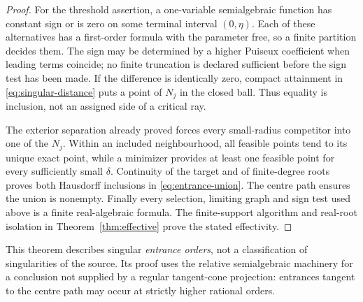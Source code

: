 \begin{proof}
For the threshold assertion, a one-variable semialgebraic function has
constant sign or is zero on some terminal interval $(0,\eta)$. Each
of these alternatives has a first-order formula with the parameter
free, so a finite partition decides them. The sign may be determined
by a higher Puiseux coefficient when leading terms coincide; no finite
truncation is declared sufficient before the sign test has been made.
If the difference is identically zero, compact attainment in
\eqref{eq:singular-distance} puts a point of $N_j$ in the closed ball.
Thus equality is inclusion, not an assigned side of a critical ray.

The exterior separation already proved forces every small-radius
competitor into one of the $N_j$. Within an included neighbourhood,
all feasible points tend to its unique exact point, while a minimizer
provides at least one feasible point for every sufficiently small
$\delta$. Continuity of the target and of finite-degree roots proves
both Hausdorff inclusions in \eqref{eq:entrance-union}. The centre path
ensures the union is nonempty. Finally every selection, limiting graph
and sign test used above is a finite real-algebraic formula. The
finite-support algorithm and real-root isolation in
Theorem~\ref{thm:effective} prove the stated effectivity.
\end{proof}

This theorem describes singular \emph{entrance orders}, not a
classification of singularities of the source. Its proof uses the
relative semialgebraic machinery for a conclusion not supplied by a
regular tangent-cone projection: entrances tangent to the centre path
may occur at strictly higher rational orders.

